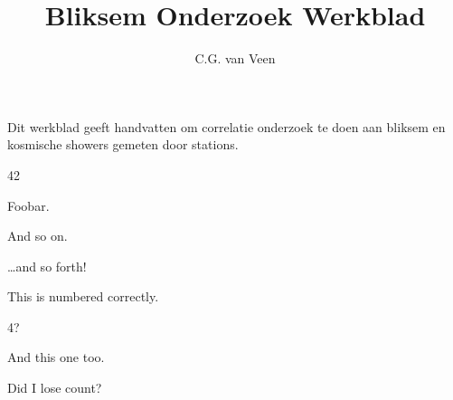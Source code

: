

\usepackage{lipsum}

\title{Bliksem Onderzoek Werkblad}
\author{C.G. van Veen}



\maketitle
Dit werkblad geeft handvatten om correlatie onderzoek te doen aan bliksem en 
kosmische showers gemeten door \hisparc stations. 
\begin{questions}


\question \lipsum[1]
\begin{solution}
  42
\end{solution}

\question Foobar.

\question And so on.
\begin{solution}
  \ldots{}and so forth!
\end{solution}



\question This is numbered correctly.
\begin{solution}
  4?
\end{solution}


\question And this one too.
\begin{solution}
  Did I lose count?
\end{solution}


\end{questions}

